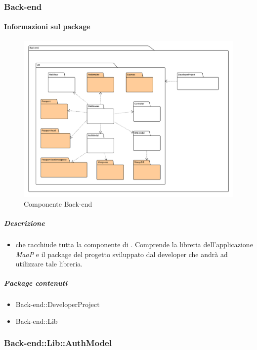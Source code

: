 
  \subsubsection{Back-end}
  \paragraph{Informazioni sul package} 
    \begin{figure}[H] 
      \begin{center} 
        \includegraphics[width=\textwidth]{packages/Back-end.png}  
        \caption{Componente Back-end}
      \end{center}  
    \end{figure} 
  \subparagraph{Descrizione} 
    \begin{itemize}
    \item[]  che racchiude tutta la componente di . Comprende la libreria dell'applicazione \textit{MaaP} e il package del progetto sviluppato dal developer che andrà ad utilizzare tale libreria.
    \end{itemize} 
    \subparagraph{Package contenuti} 
    \begin{itemize}
        \item Back-end::DeveloperProject
        \item Back-end::Lib
    \end{itemize}
  \subsubsection{Back-end::Lib::AuthModel}
